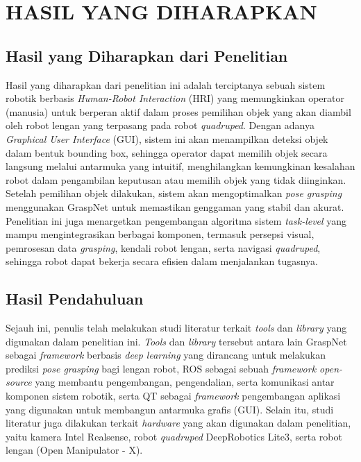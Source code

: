 \chapter{HASIL YANG DIHARAPKAN}

\section{Hasil yang Diharapkan dari Penelitian}

Hasil yang diharapkan dari penelitian ini adalah terciptanya sebuah sistem robotik berbasis
\emph{Human-Robot Interaction} (HRI) yang memungkinkan operator (manusia) untuk berperan aktif
dalam proses pemilihan objek yang akan diambil oleh robot lengan yang terpasang pada robot
\emph{quadruped}. Dengan adanya \emph{Graphical User Interface} (GUI), sistem ini akan menampilkan
deteksi objek dalam bentuk bounding box, sehingga operator dapat memilih objek secara langsung melalui
antarmuka yang intuitif, menghilangkan kemungkinan kesalahan robot dalam pengambilan keputusan atau
memilih objek yang tidak diinginkan. Setelah pemilihan objek dilakukan, sistem akan mengoptimalkan
\emph{pose grasping} menggunakan GraspNet untuk memastikan genggaman yang stabil dan akurat. Penelitian
ini juga menargetkan pengembangan algoritma sistem \emph{task-level} yang mampu mengintegrasikan berbagai komponen,
termasuk persepsi visual, pemrosesan data \emph{grasping}, kendali robot lengan, serta navigasi \emph{quadruped},
sehingga robot dapat bekerja secara efisien dalam menjalankan tugasnya.

\section{Hasil Pendahuluan}
Sejauh ini, penulis telah melakukan studi literatur terkait \emph{tools} dan \emph{library} yang digunakan dalam penelitian ini.
\emph{Tools} dan \emph{library} tersebut antara lain GraspNet sebagai \emph{framework} berbasis \emph{deep learning} yang dirancang untuk
melakukan prediksi \emph{pose grasping} bagi lengan robot, ROS sebagai sebuah \emph{framework open-source} yang membantu pengembangan,
pengendalian, serta komunikasi antar komponen sistem robotik, serta QT sebagai \emph{framework} pengembangan aplikasi yang digunakan
untuk membangun antarmuka grafis (GUI). Selain itu, studi literatur juga dilakukan terkait \emph{hardware} yang akan digunakan dalam penelitian,
yaitu kamera Intel Realsense, robot \emph{quadruped} DeepRobotics Lite3, serta robot lengan (Open Manipulator - X).

